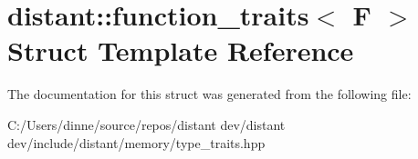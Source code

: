\hypertarget{structdistant_1_1function__traits}{}\section{distant\+:\+:function\+\_\+traits$<$ F $>$ Struct Template Reference}
\label{structdistant_1_1function__traits}


The documentation for this struct was generated from the following file\+:\begin{DoxyCompactItemize}
\item 
C\+:/\+Users/dinne/source/repos/distant dev/distant dev/include/distant/memory/type\+\_\+traits.\+hpp\end{DoxyCompactItemize}
